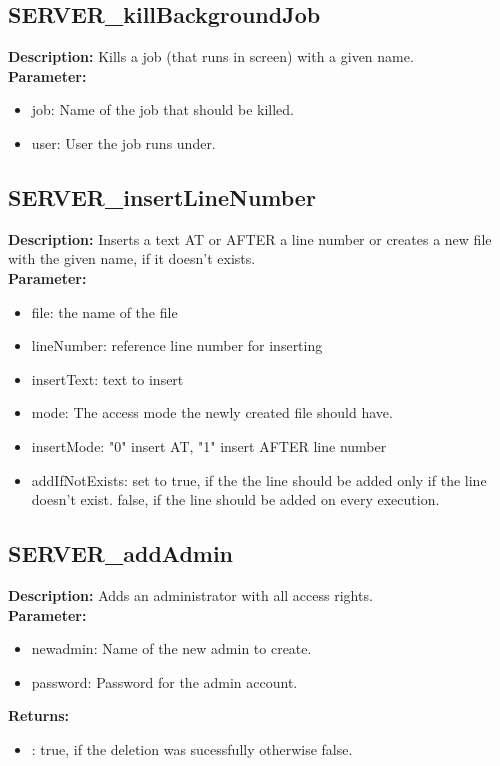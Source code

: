 \subsection{SERVER\_killBackgroundJob}
\textbf{Description:} Kills a job (that runs in screen) with a given name.\\
\textbf{Parameter:}
\begin{itemize}
\item job: Name of the job that should be killed.
\item user: User the job runs under.
\end{itemize}

\subsection{SERVER\_insertLineNumber}
\textbf{Description:} Inserts a text AT or AFTER a line number or creates a new file with the given name, if it doesn't exists.\\
\textbf{Parameter:}
\begin{itemize}
\item file: the name of the file
\item lineNumber: reference line number for inserting
\item insertText: text to insert
\item mode: The access mode the newly created file should have.
\item insertMode: "0" insert AT, "1" insert AFTER line number
\item addIfNotExists: set to true, if the the line should be added only if the line doesn't exist. false, if the line should be added on every execution.
\end{itemize}

\subsection{SERVER\_addAdmin}
\textbf{Description:} Adds an administrator with all access rights.\\
\textbf{Parameter:}
\begin{itemize}
\item newadmin: Name of the new admin to create.
\item password: Password for the admin account.
\end{itemize}
\textbf{Returns:}
\begin{itemize}
\item : true, if the deletion was sucessfully otherwise false.
\end{itemize}

